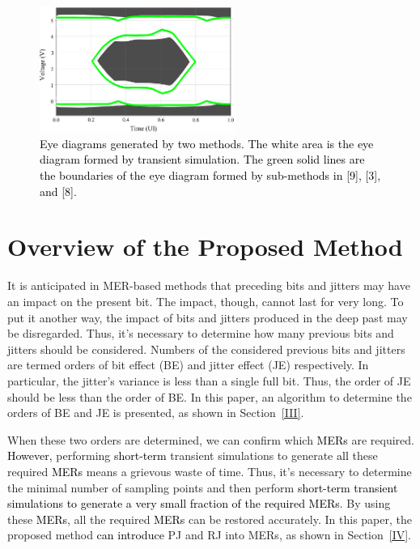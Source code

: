 \documentclass[conference]{IEEEtran}
\begin{document}
\begin{figure}[t]
\centerline{\includegraphics[width=180pt]{Fig3.png}}
\caption{\textcolor{black}{Eye diagrams generated by two methods. The white area is the eye diagram formed by transient simulation. The green solid lines are the boundaries of the eye diagram formed by sub-methods in [9], [3], and [8].}}
\label{Fig3}
\end{figure}


\section{Overview of the Proposed Method}\label{II}

\color{black}
It is anticipated in MER-based methods that preceding bits and jitters may have an impact on the present bit. The impact, though, cannot last for very long. To put it another way, the impact of bits and jitters produced in the deep past may be disregarded.
\color{black}
Thus, it's necessary to determine how many previous bits and jitters should be considered. Numbers of the considered previous bits and jitters are termed orders of bit effect (BE) and jitter effect (JE) respectively.
\color{black}
In particular, the jitter's variance is less than a single full bit.
\color{black}
Thus, the order of JE should be less than the order of BE. In this paper, an algorithm to determine the orders of BE and JE is presented, as shown in Section~\ref{III}.

When these two orders are determined, we can confirm which \textcolor{black}{MERs} are required. \textcolor{black}{However, } performing \textcolor{black}{short-term} transient simulations to generate \textcolor{black}{all} these required \textcolor{black}{MERs} means a grievous waste of time. Thus, it's necessary to determine the minimal number of sampling points and then perform \textcolor{black}{short-term transient simulations to generate a very small fraction of the required MERs}. By using these \textcolor{black}{MERs}, all the required \textcolor{black}{MERs} can be restored accurately. In this paper, the proposed method \textcolor{black}{can introduce} PJ and RJ into MERs, as shown in Section~\ref{IV}.
\end{document}
